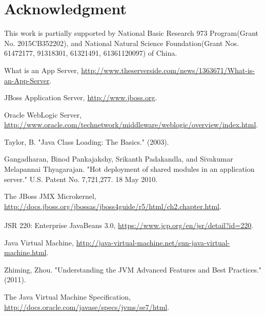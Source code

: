 \documentclass[conference]{IEEEtran}
\begin{document}
\section*{Acknowledgment}
This work is partially supported by National Basic Research 973 Program(Grant No. 2015CB352202), and National Natural Science Foundation(Grant Nos. 61472177, 91318301, 61321491, 61361120097) of China.




\begin{thebibliography}{9}

What is an App Server, \url{http://www.theserverside.com/news/1363671/What-is-an-App-Server}.

JBoss Application Server, \url{http://www.jboss.org}.

Oracle WebLogic Server, \url{http://www.oracle.com/technetwork/middleware/weblogic/overview/index.html}.


Taylor, B. "Java Class Loading: The Basics." (2003).

Gangadharan, Binod Pankajakshy, Srikanth Padakandla, and Sivakumar Melapannai Thyagarajan. "Hot deployment of shared modules in an application server." U.S. Patent No. 7,721,277. 18 May 2010.

The JBoss JMX Microkernel, \url{http://docs.jboss.org/jbossas/jboss4guide/r5/html/ch2.chapter.html}.

JSR 220: Enterprise JavaBeans\textsuperscript{\texttrademark} 3.0, \url{https://www.jcp.org/en/jsr/detail?id=220}.

Java Virtual Machine, \url{http://java-virtual-machine.net/sun-java-virtual-machine.html}.

Zhiming, Zhou. "Understanding the JVM Advanced Features and Best Practices." (2011).

The Java Virtual Machine Specification, \url{http://docs.oracle.com/javase/specs/jvms/se7/html}.


\end{thebibliography}
\end{document}
